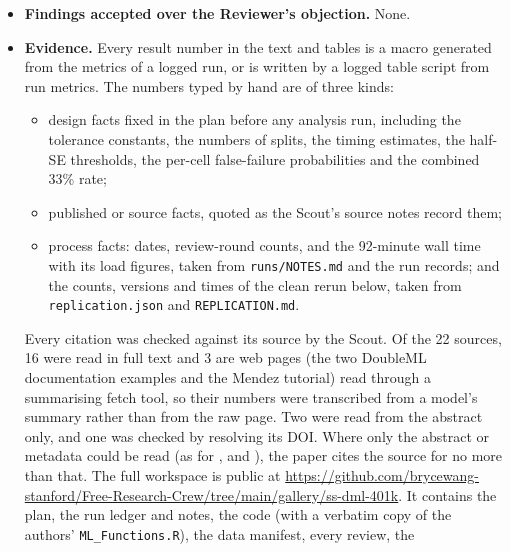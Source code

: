 \begin{itemize}
\begin{itemize}
                gate;
          \item paper round~4 (three findings), two answered in this version of the paper
                and one, on the plan's task board, answered by the PI in the plan.
        \end{itemize}
  \item \textbf{Findings accepted over the Reviewer's objection.} None.
  \item \textbf{Evidence.} Every result number in the text and tables is a macro generated
        from the metrics of a logged run, or is written by a logged table script from run
        metrics. The numbers typed by hand are of three kinds:
        \begin{itemize}
          \item design facts fixed in the plan before any analysis run, including the
                tolerance constants, the numbers of splits, the timing estimates, the
                half-SE thresholds, the per-cell false-failure probabilities and the
                combined 33\% rate;
          \item published or source facts, quoted as the Scout's source notes record them;
          \item process facts: dates, review-round counts, and the 92-minute wall time
                with its load figures, taken from \texttt{runs/NOTES.md} and the run
                records; and the counts, versions and times of the clean rerun below,
                taken from \texttt{replication.json} and \texttt{REPLICATION.md}.
        \end{itemize}
        Every citation was checked against its source by the Scout. Of the 22 sources, 16
        were read in full text and 3 are web pages (the two DoubleML documentation
        examples and the Mendez tutorial) read through a summarising fetch tool, so their
        numbers were transcribed from a model's summary rather than from the raw page. Two
        were read from the abstract only, and one was checked by resolving its DOI. Where only
        the abstract or
        metadata could be read (as for \citet{chernozhukov2004}, \citet{poterba1995} and
        \citet{abadie2003}), the paper cites the source for no more than that. The full
        workspace is public at
        \url{https://github.com/brycewang-stanford/Free-Research-Crew/tree/main/gallery/ss-dml-401k}.
        It contains the plan, the run ledger and notes, the code (with a verbatim copy of
        the authors' \texttt{ML\_Functions.R}), the data manifest, every review, the

\end{itemize}
